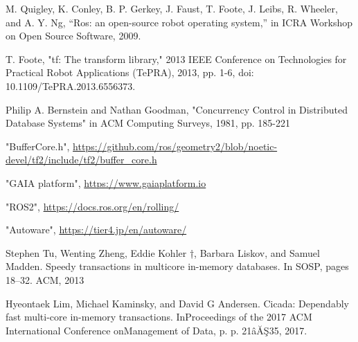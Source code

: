 \documentclass[a4paper]{jreport}	%
\begin{document}
\newpage
{}
\renewcommand{\bibname}{参考文献}



%
%

	
\begin{thebibliography}{99}


 M. Quigley, K. Conley, B. P. Gerkey, J. Faust, T. Foote, J. Leibs, R. Wheeler, and A. Y. Ng, “Ros: an open-source robot operating system,” in ICRA Workshop on Open Source Software, 2009.

 T. Foote, "tf: The transform library," 2013 IEEE Conference on Technologies for Practical Robot Applications (TePRA), 2013, pp. 1-6, doi: 10.1109/TePRA.2013.6556373.

 Philip A. Bernstein and Nathan Goodman, "Concurrency Control in Distributed Database Systems" in ACM Computing Surveys, 1981, pp. 185-221

 "BufferCore.h", \url{https://github.com/ros/geometry2/blob/noetic-devel/tf2/include/tf2/buffer_core.h}

 "GAIA platform", \url{https://www.gaiaplatform.io}

 "ROS2", \url{https://docs.ros.org/en/rolling/}

 "Autoware", \url{https://tier4.jp/en/autoware/}

 Stephen Tu, Wenting Zheng, Eddie Kohler †, Barbara Liskov,
and Samuel Madden. Speedy transactions in multicore in-memory
databases. In SOSP, pages 18–32. ACM, 2013

 Hyeontaek Lim, Michael Kaminsky, and David G Andersen. Cicada: Dependably fast multi-core in-memory transactions. InProceedings of the 2017 ACM International Conference onManagement of Data, p. p. 21âĂŞ35, 2017.

\end{thebibliography}
\end{document}
